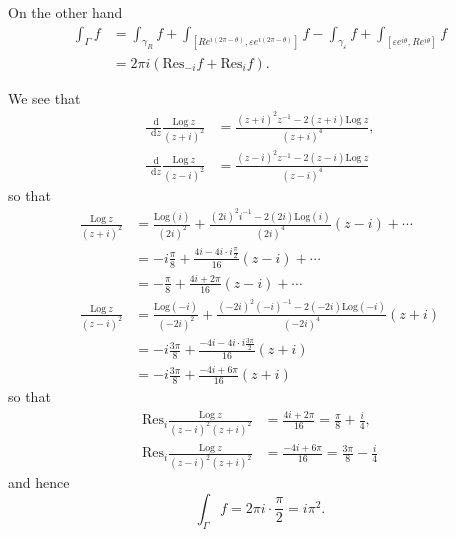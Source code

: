 \documentclass{article}
\newcommand\Res{\mathrm{Res}}
\newcommand\Log{\mathrm{Log}}
\newcommand\dif{\mathop{}\!\mathrm{d}}
\begin{document}
On the other hand
\begin{align*}
   \int_\Gamma
     f
&= \int_{\gamma_R}
     f
 + \int_{[R e^{i(2 \pi - \theta)},
          \varepsilon e^{i(2 \pi - \theta)}]}
     f
 - \int_{\gamma_\varepsilon}
     f
 + \int_{[\varepsilon e^{i \theta},
          R e^{i \theta}]}
     f \\
&= 2 \pi i
   \left(
     \Res_{-i} f
   + \Res_i f
   \right).
\end{align*}

We see that
\begin{align*}
   \frac{\dif}{\dif z}
   \frac{\Log~z}{(z + i)^2}
&= \frac{(z + i)^2 z^{-1} - 2(z + i)\Log~z}
        {(z + i)^4}, \\
   \frac{\dif}{\dif z}
   \frac{\Log~z}{(z - i)^2}
&= \frac{(z - i)^2 z^{-1} - 2(z - i)\Log~z}
        {(z - i)^4}
\end{align*}
so that
\begin{align*}
   \frac{\Log~z}{(z + i)^2}
&= \frac{\Log(i)}{(2i)^2}
 + \frac{(2i)^2 i^{-1} - 2(2i)\Log(i)}
        {(2i)^4}
   (z - i)
 + \cdots \\
&= -i\frac{\pi}{8}
 + \frac{4i - 4i \cdot i \frac{\pi}{2}}
        {16}
   (z - i)
 + \cdots \\
&= -\frac{\pi}{8}
 + \frac{4i + 2 \pi}{16} (z - i)
 + \cdots \\
   \frac{\Log~z}{(z - i)^2}
&= \frac{\Log(-i)}{(-2i)^2}
 + \frac{(-2i)^2 (-i)^{-1} - 2(-2i) \Log(-i)}
        {(-2i)^4}
   (z + i) \\
&= -i\frac{3 \pi}{8}
 + \frac{-4i - 4i \cdot i \frac{3 \pi}{2}}
        {16}
   (z + i) \\
&= -i\frac{3 \pi}{8}
 + \frac{-4i + 6 \pi}{16} (z + i)
\end{align*}
so that
\begin{align*}
   \Res_i \frac{\Log~z}{(z - i)^2 (z + i)^2}
&= \frac{4i + 2 \pi}{16}
 = \frac{\pi}{8} + \frac{i}{4}, \\
   \Res_i \frac{\Log~z}{(z - i)^2 (z + i)^2}
&= \frac{-4i + 6 \pi}{16}
 = \frac{3 \pi}{8} - \frac{i}{4}
\end{align*}
and hence
$$
  \int_\Gamma f
= 2 \pi i \cdot \frac{\pi}{2}
= i \pi^2.
$$
\end{document}
